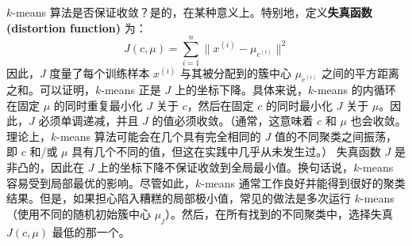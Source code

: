 $k$-means 算法是否保证收敛？是的，在某种意义上。特别地，定义\textbf{失真函数 (distortion function)} 为：
\[
    J(c, \mu) = \sum_{i=1}^n \|x^{(i)} - \mu_{c^{(i)}} \|^2
\]
因此，$J$ 度量了每个训练样本 $x^{(i)}$ 与其被分配到的簇中心 $\mu_{c^{(i)}}$ 之间的平方距离之和。可以证明，$k$-means 正是 $J$ 上的坐标下降。具体来说，$k$-means 的内循环在固定 $\mu$ 的同时重复最小化 $J$ 关于 $c$，然后在固定 $c$ 的同时最小化 $J$ 关于 $\mu$。因此，$J$ 必须单调递减，并且 $J$ 的值必须收敛。（通常，这意味着 $c$ 和 $\mu$ 也会收敛。理论上，$k$-means 算法可能会在几个具有完全相同的 $J$ 值的不同聚类之间振荡，即 $c$ 和/或 $\mu$ 具有几个不同的值，但这在实践中几乎从未发生过。）
失真函数 $J$ 是非凸的，因此在 $J$ 上的坐标下降不保证收敛到全局最小值。换句话说，$k$-means 容易受到局部最优的影响。尽管如此，$k$-means 通常工作良好并能得到很好的聚类结果。但是，如果担心陷入糟糕的局部极小值，常见的做法是多次运行 $k$-means（使用不同的随机初始簇中心 $\mu_j$）。然后，在所有找到的不同聚类中，选择失真 $J(c, \mu)$ 最低的那一个。